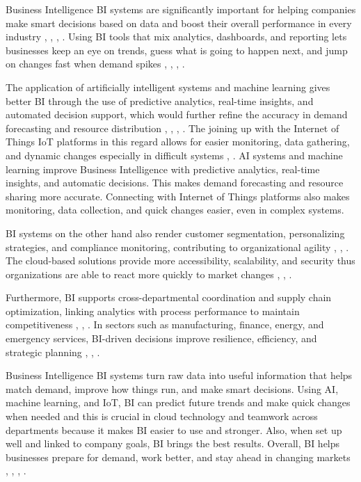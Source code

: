 \documentclass{research}
\begin{document}
Business Intelligence BI systems are significantly important for helping companies make smart decisions based on data and boost their overall performance in every industry \cite{ref42}, \cite{ref43}, \cite{ref44}, \cite{ref45}. Using BI tools that mix analytics, dashboards, and reporting lets businesses keep an eye on trends, guess what is going to happen next, and jump on changes fast when demand spikes \cite{ref46}, \cite{ref48}, \cite{ref49}, \cite{ref50}.

The application of artificially intelligent systems and machine learning gives better BI through the use of predictive analytics, real-time insights, and automated decision support, which would further refine the accuracy in demand forecasting and resource distribution \cite{ref57}, \cite{ref68}, \cite{ref42}, \cite{ref56}. The joining up with the Internet of Things IoT platforms in this regard allows for easier monitoring, data gathering, and dynamic changes especially in difficult systems \cite{ref41}, \cite{ref69}. AI systems and machine learning improve Business Intelligence with predictive analytics, real-time insights, and automatic decisions. This makes demand forecasting and resource sharing more accurate. Connecting with Internet of Things platforms also makes monitoring, data collection, and quick changes easier, even in complex systems.

BI systems on the other hand also render customer segmentation, personalizing strategies, and compliance monitoring, contributing to organizational agility \cite{ref49}, \cite{ref62}, \cite{ref59}. The cloud-based solutions provide more accessibility, scalability, and security thus organizations are able to react more quickly to market changes \cite{ref52}, \cite{ref60}, \cite{ref67}.

Furthermore, BI supports cross-departmental coordination and supply chain optimization, linking analytics with process performance to maintain competitiveness \cite{ref63}, \cite{ref66}, \cite{ref47}. In sectors such as manufacturing, finance, energy, and emergency services, BI-driven decisions improve resilience, efficiency, and strategic planning \cite{ref40}, \cite{ref58}, \cite{ref41}.

Business Intelligence BI systems turn raw data into useful information that helps match demand, improve how things run, and make smart decisions. Using AI, machine learning, and IoT, BI can predict future trends and make quick changes when needed and this is crucial in cloud technology and teamwork across departments because it makes BI easier to use and stronger. Also, when set up well and linked to company goals, BI brings the best results. Overall, BI helps businesses prepare for demand, work better, and stay ahead in changing markets \cite{ref42}, \cite{ref69}, \cite{ref50}, \cite{ref80}.
\end{document}
